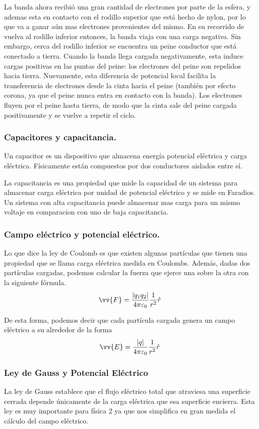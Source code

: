 \documentclass[12pt]{article}
\begin{document}
La banda ahora recibió una gran cantidad de electrones por parte de la esfera, y ademas esta en contacto con el rodillo superior que está hecho de nylon, por lo que va a ganar aún mas electrones provenientes del mismo. En su recorrido de vuelva al rodillo inferior entonces, la banda viaja con una carga negativa. Sin embargo, cerca del rodillo inferior se encuentra un peine conductor que está conectado a tierra. Cuando la banda llega cargada negativamente, esta induce cargas positivas en las puntas del peine: los electrones del peine son repelidos hacia tierra. Nuevamente, esta diferencia de potencial local facilita la transferencia de electrones desde la cinta hacia el peine (también por efecto corona, ya que el peine nunca entra en contacto con la banda). Los electrones fluyen por el peine hasta tierra, de modo que la cinta sale del peine cargada positivamente y se vuelve a repetir el ciclo.

\subsubsection*{Capacitores y capacitancia.}
Un capacitor es un dispositivo que almacena energía potencial eléctrica y carga eléctrica. Físicamente están compuestos por dos conductores aislados entre sí.

La capacitancia es una propiedad que mide la capacidad de un sistema para almacenar carga eléctrica por unidad de potencial eléctrico y se mide en Faradios. Un sistema con alta capacitancia puede almacenar mas carga para un mismo voltaje en comparacion con uno de baja capacitancia.

\subsubsection*{Campo eléctrico y potencial eléctrico.}
Lo que dice la ley de Coulomb es que existen algunas partículas que tienen una propiedad que se llama carga eléctrica medida en Coulombs. Además, dadas dos partículas cargadas, podemos calcular la fuerza que ejerce una sobre la otra con la siguiente fórmula.
\[
  \vv{F} = \frac{\left|q_{1}q_{2}\right|}{4\pi\varepsilon_{0}} \frac{1}{r^2} \hat{r}
\]

De esta forma, podemos decir que cada partícula cargada genera un campo eléctrico a su alrededor de la forma
\[
  \vv{E} = \frac{\left|q\right|}{4\pi\varepsilon_{0}} \frac{1}{r^2} \hat{r}
\]

\subsubsection*{Ley de Gauss y Potencial Eléctrico}
La ley de Gauss establece que el flujo eléctrico total que atraviesa una superficie cerrada depende únicamente de la carga eléctrica que esa superficie encierra. Esta ley es muy importante para física 2 ya que nos simplifica en gran medida el cálculo del campo eléctrico.
\end{document}
